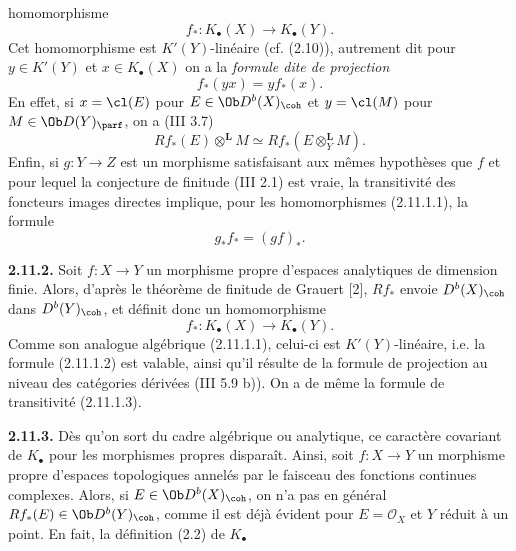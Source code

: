 homomorphisme
\begin{equation}\tag{2.11.1.1}
 f_*:K_{\bullet}(X)\longrightarrow K_{\bullet}(Y).
\end{equation}
Cet homomorphisme est \(K'(Y)\)-linéaire (cf. (2.10)), autrement dit pour \(y\in K'(Y)\) et \(x\in K_{\bullet}(X)\) on a la \emph{formule dite de projection}
\begin{equation}\tag{2.11.1.2}
 f_*(yx)=y f_*(x).
\end{equation}
En effet, si \(x=\cl(E)\) pour \(E\in\Ob D^b(X)_{\coh}\) et \(y=\cl(M)\) pour \(M\in\Ob D(Y)_{\parf}\), on a (III 3.7)
\[
 Rf_*(E)\otimes^{\mathbf L}M\simeq
 Rf_*(E\otimes_Y^{\mathbf L}M).
\]
Enfin, si \(g:Y\to Z\) est un morphisme satisfaisant aux mêmes hypothèses que \(f\) et pour lequel la conjecture de finitude (III 2.1) est vraie, la transitivité des foncteurs images directes implique, pour les homomorphismes (2.11.1.1), la formule
\begin{equation}\tag{2.11.1.3}
 g_*f_*=(gf)_*.
\end{equation}

\textbf{2.11.2.} Soit \(f:X\to Y\) un morphisme propre d'espaces analytiques de dimension finie. Alors, d'après le théorème de finitude de Grauert [2], \(Rf_*\) envoie \(D^b(X)_{\coh}\) dans \(D^b(Y)_{\coh}\), et définit donc un homomorphisme
\begin{equation}\tag{2.11.2.1}
 f_*:K_{\bullet}(X)\longrightarrow K_{\bullet}(Y).
\end{equation}
Comme son analogue algébrique (2.11.1.1), celui-ci est \(K'(Y)\)-linéaire, i.e. la formule (2.11.1.2) est valable, ainsi qu'il résulte de la formule de projection au niveau des catégories dérivées (III 5.9 b)). On a de même la formule de transitivité (2.11.1.3).

\textbf{2.11.3.} Dès qu'on sort du cadre algébrique ou analytique, ce caractère covariant de \(K_{\bullet}\) pour les morphismes propres disparaît. Ainsi, soit \(f:X\to Y\) un morphisme propre d'espaces topologiques annelés par le faisceau des fonctions continues complexes. Alors, si \(E\in\Ob D^b(X)_{\coh}\), on n'a pas en général \(Rf_*(E)\in\Ob D^b(Y)_{\coh}\), comme il est déjà évident pour \(E=\mathcal O_X\) et \(Y\) réduit à un point. En fait, la définition (2.2) de \(K_{\bullet}\)
